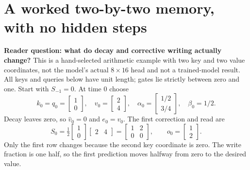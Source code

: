 \documentclass[10pt,letterpaper]{article}
\newcommand{\psection}[1]{\clearpage\section{#1}}
\begin{document}
\psection{A worked two-by-two memory, with no hidden steps}
\textbf{Reader question: what do decay and corrective writing actually change?}
This is a hand-selected arithmetic example with two key and two value coordinates, not the model's actual $8\times16$ head and not a trained-model result. All keys and queries below have unit length; gates lie strictly between zero and one. Start with $S_{-1}=0$. At time 0 choose
\begin{equation}
k_0=q_0=\begin{bmatrix}1\\0\end{bmatrix},\quad
v_0=\begin{bmatrix}2\\4\end{bmatrix},\quad
\alpha_0=\begin{bmatrix}1/2\\3/4\end{bmatrix},\quad\beta_0=1/2.
\end{equation}
Decay leaves zero, so $\widehat v_0=0$ and $e_0=v_0$. The first correction and read are
\begin{equation}
S_0=\tfrac12\begin{bmatrix}1\\0\end{bmatrix}\begin{bmatrix}2&4\end{bmatrix}
=\begin{bmatrix}1&2\\0&0\end{bmatrix},\qquad o_0=\begin{bmatrix}1\\2\end{bmatrix}.
\end{equation}
Only the first row changes because the second key coordinate is zero. The write fraction is one half, so the first prediction moves halfway from zero to the desired value.
\end{document}
